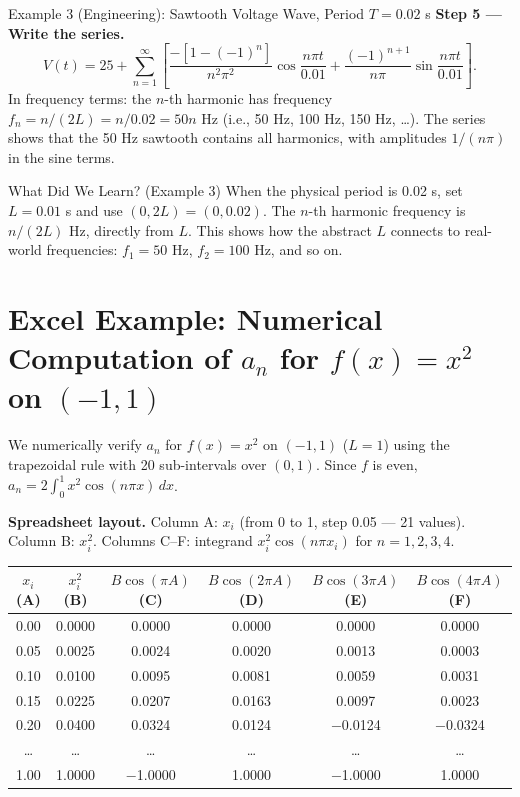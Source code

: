 \documentclass[12pt,a4paper]{article}
\begin{document}
\begin{infobox}{Example 3 (Engineering): Sawtooth Voltage Wave, Period $T = 0.02$ s}
\textbf{Step 5 --- Write the series.}
\[
V(t) = 25 + \sum_{n=1}^{\infty}\left[\frac{-[1-(-1)^n]}{n^2\pi^2}\cos\frac{n\pi t}{0.01}
+ \frac{(-1)^{n+1}}{n\pi}\sin\frac{n\pi t}{0.01}\right].
\]
In frequency terms: the $n$-th harmonic has frequency $f_n = n/(2L) = n/0.02 = 50n$ Hz (i.e., 50 Hz, 100 Hz, 150 Hz, \ldots).
The series shows that the 50 Hz sawtooth contains all harmonics, with amplitudes $1/(n\pi)$ in the sine terms.
\end{infobox}

\begin{learnbox}{What Did We Learn? (Example 3)}
When the physical period is 0.02 s, set $L = 0.01$ s and use $(0, 2L) = (0, 0.02)$.
The $n$-th harmonic frequency is $n/(2L)$ Hz, directly from $L$.
This shows how the abstract $L$ connects to real-world frequencies: $f_1 = 50$ Hz, $f_2 = 100$ Hz, and so on.
\end{learnbox}

\section{Excel Example: Numerical Computation of $a_n$ for $f(x) = x^2$ on $(-1,1)$}

We numerically verify $a_n$ for $f(x) = x^2$ on $(-1,1)$ ($L=1$) using the trapezoidal rule with 20 sub-intervals over $(0,1)$.
Since $f$ is even, $a_n = 2\int_0^1 x^2\cos(n\pi x)\,dx$.

\medskip
\noindent\textbf{Spreadsheet layout.}
Column A: $x_i$ (from 0 to 1, step 0.05 --- 21 values).
Column B: $x_i^2$.
Columns C--F: integrand $x_i^2\cos(n\pi x_i)$ for $n = 1, 2, 3, 4$.

\begin{center}
\begin{tabular}{cccccc}
\toprule
$x_i$ (A) & $x_i^2$ (B) & $B\cos(\pi A)$ (C) & $B\cos(2\pi A)$ (D) & $B\cos(3\pi A)$ (E) & $B\cos(4\pi A)$ (F) \\
\midrule
0.00 & 0.0000 & 0.0000 & 0.0000 & 0.0000 & 0.0000 \\
0.05 & 0.0025 & 0.0024 & 0.0020 & 0.0013 & 0.0003 \\
0.10 & 0.0100 & 0.0095 & 0.0081 & 0.0059 & 0.0031 \\
0.15 & 0.0225 & 0.0207 & 0.0163 & 0.0097 & 0.0023 \\
0.20 & 0.0400 & 0.0324 & 0.0124 & $-$0.0124 & $-$0.0324 \\
\ldots & \ldots & \ldots & \ldots & \ldots & \ldots \\
1.00 & 1.0000 & $-$1.0000 & 1.0000 & $-$1.0000 & 1.0000 \\
\bottomrule
\end{tabular}
\end{center}
\end{document}
